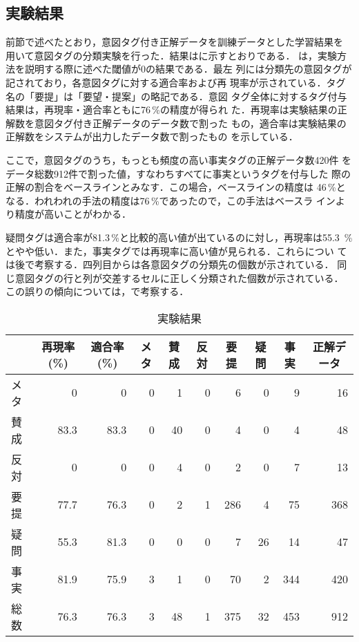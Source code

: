 \subsection{実験結果}

前節で述べたとおり，意図タグ付き正解データを訓練データとした学習結果を
用いて意図タグの分類実験を行った．結果はに示すとおりである．
は，実験方法を説明する際に述べた閾値が0の結果である．最左
列には分類先の意図タグが記されており，各意図タグに対する適合率および再
現率が示されている．タグ名の「要提」は「要望・提案」の略記である．意図
タグ全体に対するタグ付与結果は，再現率・適合率ともに76\,\%の精度が得られ
た．再現率は実験結果の正解数を意図タグ付き正解データのデータ数で割った
もの，適合率は実験結果の正解数をシステムが出力したデータ数で割ったもの
を示している．

ここで，意図タグのうち，もっとも頻度の高い事実タグの正解データ数420件
をデータ総数912件で割った値，すなわちすべてに事実というタグを付与した
際の正解の割合をベースラインとみなす．この場合，ベースラインの精度は 
46\,\%となる．われわれの手法の精度は76\,\%であったので，この手法はベースラ
インより精度が高いことがわかる．

疑問タグは適合率が81.3\,\%と比較的高い値が出ているのに対し，再現率は55.3
\,\%とやや低い．また，事実タグでは再現率に高い値が見られる．これらについ
ては後で考察する．四列目からは各意図タグの分類先の個数が示されている．
同じ意図タグの行と列が交差するセルに正しく分類された個数が示されている．
この誤りの傾向については，で考察する．


\begin{table}[t]
\begin{center}
\leavevmode
\caption{実験結果}
\label{tab:result}
\begin{tabular}{|l|r|r||r|r|r|r|r|r||r|}
\hline
&\multicolumn{1}{c|}{再現率(\%)}
&\multicolumn{1}{c||}{適合率(\%)}
&\multicolumn{1}{c|}{メタ}
&\multicolumn{1}{c|}{賛成}
&\multicolumn{1}{c|}{反対}
&\multicolumn{1}{c|}{要提}
&\multicolumn{1}{c|}{疑問}
&\multicolumn{1}{c||}{事実}
&\multicolumn{1}{c|}{正解データ}
\\ \hline \hline
メタ &0 &0 &0 &1 &0 &6 &0 &9 &16 \\ \hline
賛成 &83.3 &83.3 &0 &40 &0 &4 &0 &4 &48 \\ \hline
反対 &0 &0 &0 &4 &0 &2 &0 &7 &13 \\ \hline
要提 &77.7 &76.3 &0 &2 &1 &286 &4 &75 &368 \\ \hline
疑問 &55.3 &81.3 &0 &0 &0 &7 &26 &14 &47 \\ \hline
事実 &81.9 &75.9 &3 &1 &0 &70 &2 &344 &420 \\ \hline
\hline
総数 &76.3 &76.3 &3 &48 &1 &375 &32 &453 &912 \\ \hline
\end{tabular}
\end{center}
\end{table}


